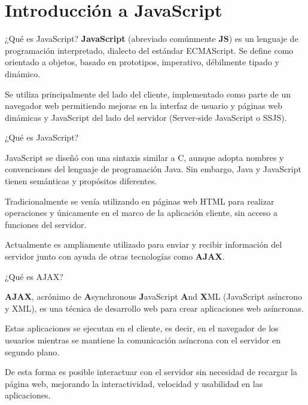 
\section{Introducción a JavaScript}

\begin{frame}[c]{¿Qué es JavaScript?}
  \textbf{JavaScript} (abreviado comúnmente \textbf{JS}) es un lenguaje de
  programación interpretado, dialecto del estándar ECMAScript. Se define
  como orientado a objetos, basado en prototipos, imperativo, débilmente
  tipado y dinámico. 

  \vspace{\baselineskip}
  Se utiliza principalmente del lado del cliente, implementado como parte
  de un navegador web permitiendo mejoras en la interfaz de usuario y
  páginas web dinámicas y JavaScript del lado del servidor (Server-side
  JavaScript o SSJS).
\end{frame}

\begin{frame}[c]{¿Qué es JavaScript?}

  JavaScript se diseñó con una sintaxis similar a C, aunque adopta nombres
  y convenciones del lenguaje de programación Java. Sin embargo, Java y
  JavaScript tienen semánticas y propósitos diferentes.

  \vspace{\baselineskip}
  Tradicionalmente se venía utilizando en páginas web HTML para realizar
  operaciones y únicamente en el marco de la aplicación cliente, sin acceso
  a funciones del servidor.

  \vspace{\baselineskip}
  Actualmente es ampliamente utilizado para enviar y recibir información del
  servidor junto con ayuda de otras tecnologías como \textbf{AJAX}.

\end{frame}

\begin{frame}[c]{¿Qué es AJAX?}

  \textbf{AJAX}, acrónimo de \textbf{A}synchronous \textbf{J}avaScript
  \textbf{A}nd \textbf{X}ML (JavaScript asíncrono y XML), es una técnica
  de desarrollo web para crear aplicaciones web asíncronas.

  \vspace{\baselineskip}
  Estas aplicaciones se ejecutan en el cliente, es decir, en el navegador
  de los usuarios mientras se mantiene la comunicación asíncrona con el
  servidor en segundo plano.

  \vspace{\baselineskip}
  De esta forma es posible interactuar con el
  servidor sin necesidad de recargar la página web, mejorando la
  interactividad, velocidad y usabilidad en las aplicaciones.
\end{frame}


